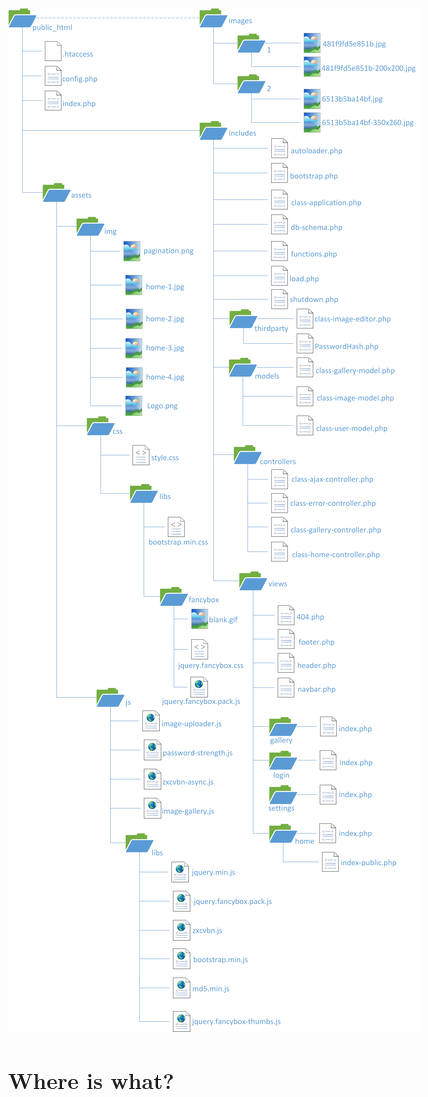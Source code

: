 \documentclass[a4paper,12pt,oneside]{article} %
\begin{document}
\includegraphics[scale=0.4]{images/file-tree}\\

\subsection{Where is what?}
\end{document}
